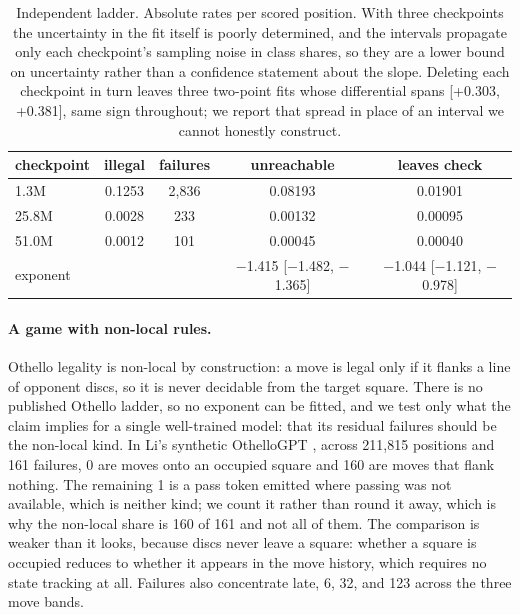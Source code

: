 \documentclass[11pt]{article}
\begin{document}
\begin{table}[t]
\centering\small
\caption{Independent ladder. Absolute rates per scored position. With three
checkpoints the uncertainty in the fit itself is poorly determined, and the intervals
propagate only each checkpoint's sampling noise in class shares, so they are a lower
bound on uncertainty rather than a confidence statement about the slope. Deleting
each checkpoint in turn leaves three two-point fits whose differential spans
[+0.303, +0.381], same sign throughout; we report that spread in place of an
interval we cannot honestly construct.}
\label{tab:external}
\begin{tabular}{lcccc}
\toprule
checkpoint & illegal & failures & unreachable & leaves check \\
\midrule
1.3M     & 0.1253     & 2,836     & 0.08193     & 0.01901 \\
25.8M   & 0.0028   & 233   & 0.00132   & 0.00095 \\
51.0M & 0.0012 & 101 & 0.00045 & 0.00040 \\
\midrule
exponent & & & $-$1.415 [$-$1.482, $-$1.365] & $-$1.044 [$-$1.121, $-$0.978] \\
\bottomrule
\end{tabular}
\end{table}

\paragraph{A game with non-local rules.}
Othello legality is non-local by construction: a move is legal only if it flanks a
line of opponent discs, so it is never decidable from the target square. There is
no published Othello ladder, so no exponent can be fitted, and we test only what
the claim implies for a single well-trained model: that its residual failures
should be the non-local kind. In Li's synthetic OthelloGPT \citep{li2023emergent},
across 211,815 positions and 161 failures, 0 are moves onto an
occupied square and 160 are moves that flank nothing. The remaining
1 is a pass token emitted where passing was not available, which is neither
kind; we count it rather than round it away, which is why the non-local share is
160 of 161 and not all of them. The comparison is weaker than it looks, because discs never leave a
square: whether a square is occupied reduces to whether it appears in the move
history, which requires no state tracking at all. Failures also concentrate late,
6, 32, and 123 across the three move
bands.
\end{document}
